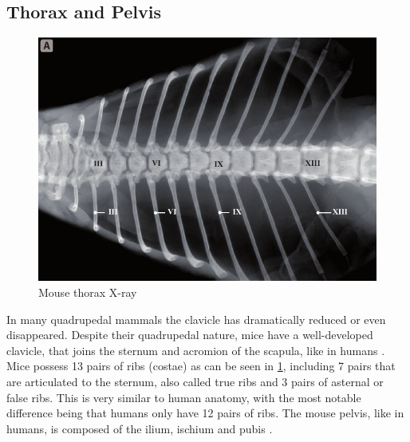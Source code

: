 \subsection{Thorax and Pelvis}\label{s:b-mouse-th-pel}
\begin{figure}[h]
	\centerline{
		\includegraphics[scale=0.6]{images/mouseThorax.png}}
	\caption{Mouse thorax X-ray \cite{harrisonVertebralLandmarksIdentification2013}}\label{fig:mouseThorax}
\end{figure}

\noindent
In many quadrupedal mammals the clavicle has dramatically reduced or even disappeared.
Despite their quadrupedal nature, mice have a well-developed clavicle,
that joins the sternum and acromion of the scapula, like in humans \cite{ruberteBridgingMouseHuman2023}.
Mice possess 13 pairs of ribs (costae) as can be seen in \cref{fig:mouseThorax}, including 7 pairs that are articulated to the sternum, also called true ribs
and 3 pairs of asternal or false ribs.
This is very similar to human anatomy, with the most notable difference being that humans only have 12 pairs of ribs.
The mouse pelvis, like in humans, is composed of the ilium, ischium and pubis \cite{platzerTaschenatlasAnatomieBd2013,ruberteMorphologicalMousePhenotyping2017,halleOpenAnatomyBrowser2017}.


